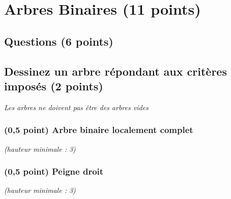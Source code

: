 \documentclass[11pt,a4paper]{article}
\begin{document}


\vspace*{-0.75cm}


\section{Arbres Binaires (11 points)}

\subsection*{Questions (6 points) }

\subsection{Dessinez un arbre répondant aux critères imposés (2 points) }

\begin{center}
\textit{Les arbres ne doivent pas être des arbres vides}
\end{center}

\vspace{-0.5cm}

\begin{table}[ht!]
  \centering
  \begin{minipage}{0.50\textwidth}
    \centering

\subsubsection{(0,5 point) Arbre binaire localement complet}

\textit{(hauteur minimale : 3)}

\vspace*{6.5cm}

  \end{minipage}
  \hfillx
  \begin{minipage}{0.50\textwidth}
    \centering

\subsubsection{(0,5 point) Peigne droit}

\textit{(hauteur minimale : 3)}

\vspace*{6.5cm}

  \end{minipage}
\end{table}
\end{document}
